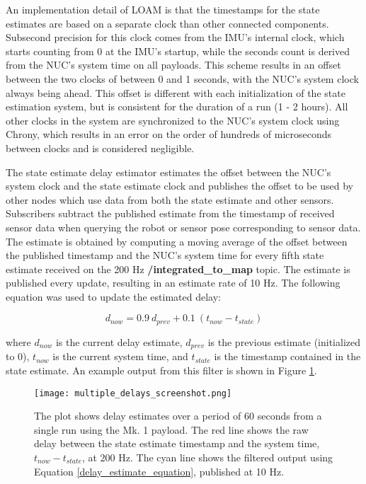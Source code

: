 An implementation detail of LOAM is that the timestamps for the state estimates are based on a separate clock than other connected components. Subsecond precision for this clock comes from the IMU's internal clock, which starts counting from 0 at the IMU's startup, while the seconds count is derived from the NUC's system time on all payloads. This scheme results in an offset between the two clocks of between 0 and 1 seconds, with the NUC's system clock always being ahead. This offset is different with each initialization of the state estimation system, but is consistent for the duration of a run (1 - 2 hours). All other clocks in the system are synchronized to the NUC's system clock using Chrony, which results in an error on the order of hundreds of microseconds between clocks and is considered negligible.

The state estimate delay estimator estimates the offset between the NUC's system clock and the state estimate clock and publishes the offset to be used by other nodes which use data from both the state estimate and other sensors. Subscribers subtract the published estimate from the timestamp of received sensor data when querying the robot or sensor pose corresponding to sensor data. The estimate is obtained by computing a moving average of the offset between the published timestamp and the NUC's system time for every fifth state estimate received on the 200 Hz \textbf{/integrated\_to\_map} topic. The estimate is published every update, resulting in an estimate rate of 10 Hz. The following equation was used to update the estimated delay:

\begin{equation} \label{delay_estimate_equation}
d_{now} = 0.9 \ d_{prev} + 0.1 \ (t_{now} - t_{state})
\end{equation}

where $d_{now}$ is the current delay estimate, $d_{prev}$ is the previous estimate (initialized to 0), $t_{now}$ is the current system time, and $t_{state}$ is the timestamp contained in the state estimate. An example output from this filter is shown in Figure \ref{multiple_delays}.

\begin{figure}	
	\centering
	\texttt{[image: multiple\_delays\_screenshot.png]}
	\caption[Raw and filtered state estimation delay]{The plot shows delay estimates over a period of 60 seconds from a single run using the Mk. 1 payload. The red line shows the raw delay between the state estimate timestamp and the system time, $t_{now} - t_{state}$, at 200 Hz. The cyan line shows the filtered output using Equation \ref{delay_estimate_equation}, published at 10 Hz.}
	\label{multiple_delays}
\end{figure}

